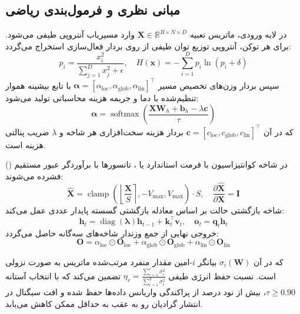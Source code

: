\subsection{مبانی نظری و فرمول‌بندی ریاضی}
در لایه ورودی، ماتریس تعبیه $\mathbf{X} \in \mathbb{R}^{B \times N \times D}$ وارد مسیریاب آنتروپی طیفی می‌شود. برای هر توکن، آنتروپی توزیع توان طیفی از روی بردار فعال‌سازی استخراج می‌گردد:
\begin{equation}
p_i = \frac{x_i^2}{\sum_{j=1}^D x_j^2 + \epsilon}, \quad H(\mathbf{x}) = -\sum_{i=1}^D p_i \ln(p_i + \delta)
\end{equation}
سپس بردار وزن‌های تخصیص مسیر $\boldsymbol{\alpha} = [\alpha_{\text{loc}}, \alpha_{\text{glob}}, \alpha_{\text{lin}}]^\top$ با تابع بیشینه هموار تنظیم‌شده با دما و جریمه هزینه محاسباتی تولید می‌شود:
\begin{equation}
\boldsymbol{\alpha} = \operatorname{softmax}\left(\frac{\mathbf{X} \mathbf{W}_h + \mathbf{b}_h - \lambda \mathbf{c}}{\tau}\right)
\end{equation}
که در آن $\mathbf{c} = [c_{\text{loc}}, c_{\text{glob}}, c_{\text{lin}}]^\top$ بردار هزینه سخت‌افزاری هر شاخه و $\lambda$ ضریب پنالتی هزینه است.

در شاخه کوانتیزاسیون  با فرمت استاندارد  یا ، تانسورها با برآوردگر عبور مستقیم () فشرده می‌شوند:
\begin{equation}
\hat{\mathbf{X}} = \operatorname{clamp}\left( \left\lfloor \frac{\mathbf{X}}{S} \right\rceil, -V_{\max}, V_{\max} \right) \cdot S, \quad \frac{\partial \hat{\mathbf{X}}}{\partial \mathbf{X}} = \mathbf{I}
\end{equation}
شاخه بازگشتی حالت بر اساس معادله بازگشتی گسسته پایدار عددی عمل می‌کند:
\begin{equation}
\mathbf{h}_t = \operatorname{diag}(\boldsymbol{\lambda}) \mathbf{h}_{t-1} + \mathbf{k}_t^\top \mathbf{v}_t, \quad \mathbf{o}_t = \mathbf{q}_t \mathbf{h}_t
\end{equation}
خروجی نهایی از جمع وزندار شاخه‌های سه‌گانه حاصل می‌گردد:
\begin{equation}
\mathbf{O} = \alpha_{\text{loc}} \odot \mathbf{O}_{\text{loc}} + \alpha_{\text{glob}} \odot \mathbf{O}_{\text{glob}} + \alpha_{\text{lin}} \odot \mathbf{O}_{\text{lin}}
\end{equation}

که در آن $\sigma_i(\mathbf{W})$ بیانگر $i$-امین مقدار منفرد مرتب‌شده ماتریس به صورت نزولی است. نسبت حفظ انرژی طیفی $\eta_r = \frac{\sum_{i=1}^r \sigma_i^2}{\sum_{i=1}^{d} \sigma_i^2}$ تضمین می‌کند که با انتخاب آستانه $\tau \ge 0.90$، بیش از نود درصد از پراکندگی واریانس داده‌ها حفظ شده و افت سیگنال در انتشار گرادیان رو به عقب به حداقل ممکن کاهش می‌یابد.

